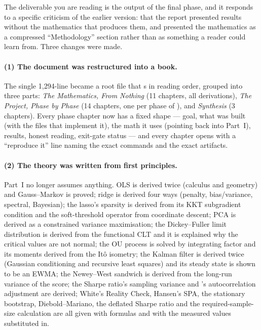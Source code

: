The deliverable you are reading is the output of the final phase, and it responds to a
specific criticism of the earlier version: that the report presented results without the
mathematics that produces them, and presented the mathematics as a compressed
``Methodology'' section rather than as something a reader could learn from. Three changes
were made.

\paragraph{(1) The document was restructured into a book.} The single 1{,}294-line
 became a root file that s
 in reading order, grouped into three parts:
\emph{The Mathematics, From Nothing} (11 chapters, all derivations), \emph{The Project,
Phase by Phase} (14 chapters, one per phase of ), and \emph{Synthesis}
(3 chapters). Every phase chapter now has a fixed shape --- goal, what was built (with the
files that implement it), the math it uses (pointing back into Part~I), results, honest
reading, exit-gate status --- and every chapter opens with a ``reproduce it'' line naming
the exact commands and the exact artifacts.

\paragraph{(2) The theory was written from first principles.} Part~I no longer assumes
anything. OLS is derived twice (calculus and geometry) and Gauss--Markov is proved; ridge
is derived four ways (penalty, bias/variance, spectral, Bayesian); the lasso's sparsity is
derived from its KKT subgradient condition and the soft-threshold operator from coordinate
descent; PCA is derived as a constrained variance maximisation; the Dickey--Fuller limit
distribution is derived from the functional CLT and it is explained why the critical values
are not normal; the OU process is solved by integrating factor and its moments derived from
the Itô isometry; the Kalman filter is derived twice (Gaussian conditioning and recursive
least squares) and its steady state is shown to be an EWMA; the Newey--West sandwich is
derived from the long-run variance of the score; the Sharpe ratio's sampling variance and
\cite{lo2002statistics}'s autocorrelation adjustment are derived; White's Reality Check,
Hansen's SPA, the stationary bootstrap, Diebold--Mariano, the deflated Sharpe ratio and the
required-sample-size calculation are all given with formulas and with the measured values
substituted in.

